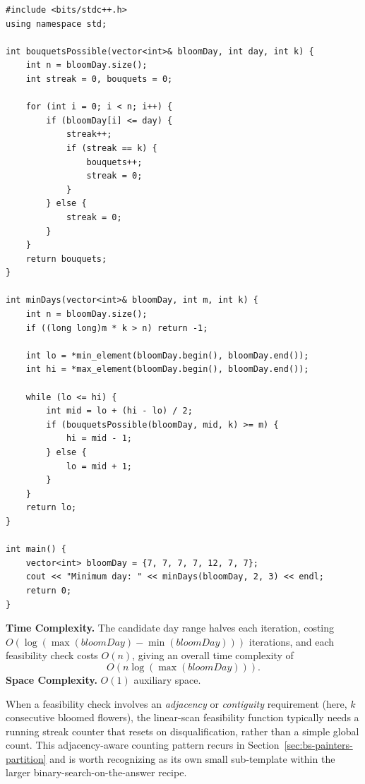 \begin{lstlisting}
#include <bits/stdc++.h>
using namespace std;

int bouquetsPossible(vector<int>& bloomDay, int day, int k) {
    int n = bloomDay.size();
    int streak = 0, bouquets = 0;

    for (int i = 0; i < n; i++) {
        if (bloomDay[i] <= day) {
            streak++;
            if (streak == k) {
                bouquets++;
                streak = 0;
            }
        } else {
            streak = 0;
        }
    }
    return bouquets;
}

int minDays(vector<int>& bloomDay, int m, int k) {
    int n = bloomDay.size();
    if ((long long)m * k > n) return -1;

    int lo = *min_element(bloomDay.begin(), bloomDay.end());
    int hi = *max_element(bloomDay.begin(), bloomDay.end());

    while (lo <= hi) {
        int mid = lo + (hi - lo) / 2;
        if (bouquetsPossible(bloomDay, mid, k) >= m) {
            hi = mid - 1;
        } else {
            lo = mid + 1;
        }
    }
    return lo;
}

int main() {
    vector<int> bloomDay = {7, 7, 7, 7, 12, 7, 7};
    cout << "Minimum day: " << minDays(bloomDay, 2, 3) << endl;
    return 0;
}
\end{lstlisting}

\begin{complexitybox}
\textbf{Time Complexity.} The candidate day range halves each iteration,
costing $O(\log(\max(\textit{bloomDay}) - \min(\textit{bloomDay})))$
iterations, and each feasibility check costs $O(n)$, giving an overall
time complexity of
\[
  O(n \log(\max(\textit{bloomDay}))).
\]
\textbf{Space Complexity.} $O(1)$ auxiliary space.
\end{complexitybox}

\begin{takeawaybox}
When a feasibility check involves an \emph{adjacency} or
\emph{contiguity} requirement (here, $k$ consecutive bloomed flowers),
the linear-scan feasibility function typically needs a running streak
counter that resets on disqualification, rather than a simple global
count. This adjacency-aware counting pattern recurs in
Section~\ref{sec:bs-painters-partition} and is worth recognizing as its
own small sub-template within the larger binary-search-on-the-answer
recipe.
\end{takeawaybox}
